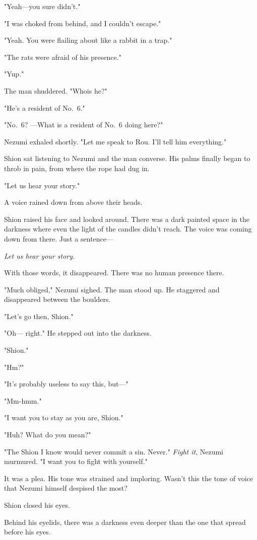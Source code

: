 "Yeah---you sure didn't."

"I was choked from behind, and I couldn't escape."

"Yeah. You were flailing about like a rabbit in a trap."

"The rats were afraid of his presence."

"Yup."

The man shuddered. "Who\el is he?"

"He's a resident of No.~6."

"No.~6? ---What is a resident of No.~6 doing here?"

Nezumi exhaled shortly. "Let me speak to Rou. I'll tell him everything."

Shion sat listening to Nezumi and the man converse. His palms finally
began to throb in pain, from where the rope had dug in.

"Let us hear your story."

A voice rained down from above their heads.

Shion raised his face and looked around. There was a dark painted space
in the darkness where even the light of the candles didn't reach. The
voice was coming down from there. Just a sentence---

\emph{Let us hear your story.}

With those words, it disappeared. There was no human presence there.

"Much obliged," Nezumi sighed. The man stood up. He staggered and
disappeared between the boulders.

"Let's go then, Shion."

"Oh--- right." He stepped out into the darkness.

"Shion."

"Hm?"

"It's probably useless to say this, but---"

"Mm-hmm."

"I want you to stay as you are, Shion."

"Huh? What do you mean?"

"The Shion I know would never commit a sin. Never." \emph{Fight it}, Nezumi
murmured. "I want you to fight with yourself."

It was a plea. His tone was strained and imploring. Wasn't this the tone
of voice that Nezumi himself despised the most?

Shion closed his eyes.

Behind his eyelids, there was a darkness even deeper than the one that
spread before his eyes.